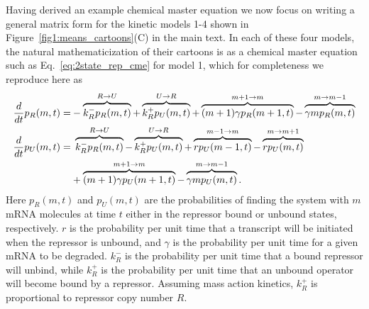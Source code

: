 Having derived an example chemical master equation we now focus on writing a
general matrix form for the kinetic models 1-4 shown in
Figure~\ref{fig1:means_cartoons}(C) in the main text. In each of these four
models, the natural mathematicization of their cartoons is as a chemical master
equation such as Eq.~\ref{eq:2state_rep_cme} for model 1, which for
completeness we reproduce here as
\begin{align}
\begin{split}
\frac{d {}}{d t}p_R(m,t) =& 
- \overbrace{k_R^- p_R(m,t)}^{R \rightarrow U}
+ \overbrace{k_R^+ p_U(m,t)}^{U \rightarrow R}
+ \overbrace{(m+1)\gamma p_R(m+1,t)}^{m + 1 \rightarrow m}
- \overbrace{\gamma mp_R(m,t)}^{m \rightarrow m - 1}
\\
\frac{d {}}{d t}p_U(m,t) =&\; 
\overbrace{k_R^- p_R(m,t)}^{R \rightarrow U}
- \overbrace{k_R^+ p_U(m,t)}^{U \rightarrow R}
+ \overbrace{rp_U(m-1,t)}^{m-1 \rightarrow m}
- \overbrace{rp_U(m,t)}^{m \rightarrow m + 1}
\\
&+ \overbrace{(m+1)\gamma p_U(m+1,t)}^{m + 1 \rightarrow m}
- \overbrace{\gamma mp_U(m,t)}^{m \rightarrow m - 1}.
\label{eq:poisson_promoter_cme_appdx}
\end{split}
\end{align}
Here $p_R(m,t)$ and $p_U(m,t)$ are the probabilities of finding the system with
$m$ mRNA molecules at time $t$ either in the repressor bound or unbound states,
respectively. $r$ is the probability per unit time that a transcript will be
initiated when the repressor is unbound, and $\gamma$ is the probability per
unit time for a given mRNA to be degraded. $k_R^-$ is the probability per unit
time that a bound repressor will unbind, while $k_R^+$ is the probability per
unit time that an unbound operator will become bound by a repressor. Assuming
mass action kinetics, $k_R^+$ is proportional to repressor copy number $R$.

